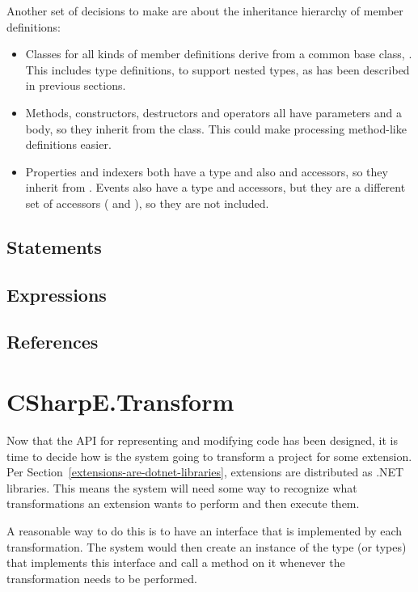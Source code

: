 \medskip

Another set of decisions to make are about the inheritance hierarchy of member definitions:

\begin{itemize}
\item Classes for all kinds of member definitions derive from a common base class, . This includes type definitions, to support nested types, as has been described in previous sections.
\item Methods, constructors, destructors and operators all have parameters and a body, so they inherit from the  class. This could make processing method-like definitions easier.
\item Properties and indexers both have a type and also  and  accessors, so they inherit from . Events also have a type and accessors, but they are a different set of accessors ( and ), so they are not included.
\end{itemize}


\subsection{Statements}

\subsection{Expressions}

\subsection{References}

\section{CSharpE.Transform}


Now that the \ac{API} for representing and modifying code has been designed, it is time to decide how is the system going to transform a project for some extension. Per Section~\ref{extensions-are-dotnet-libraries}, extensions are distributed as .NET libraries. This means the system will need some way to recognize what transformations an extension wants to perform and then execute them.

A reasonable way to do this is to have an interface that is implemented by each transformation. The system would then create an instance of the type (or types) that implements this interface and call a method on it whenever the transformation needs to be performed.

